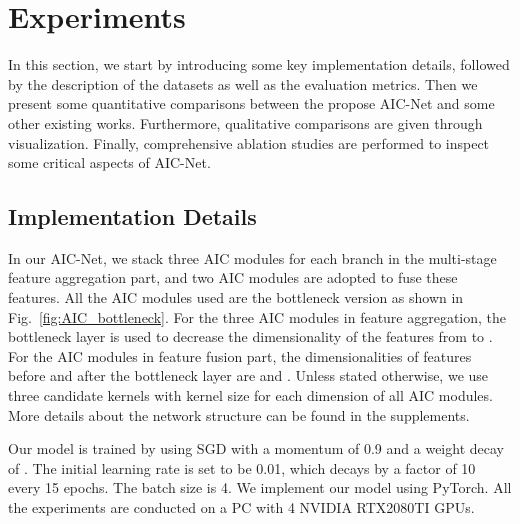 

\section{Experiments}

In this section, we start by introducing some key implementation details, followed by the description of the datasets as well as the evaluation metrics. Then we present some quantitative comparisons between the propose AIC-Net and some other existing works. Furthermore, qualitative comparisons are given through visualization. Finally, comprehensive ablation studies are performed to inspect some critical aspects of AIC-Net.



\subsection{Implementation Details}
\vspace{-0.1cm}
\noindent
In our AIC-Net, we stack three AIC modules for each branch in the multi-stage feature aggregation part, and two AIC modules are adopted to fuse these features. All the AIC modules used are the bottleneck version as shown in Fig.~\ref{fig:AIC_bottleneck}. For the three AIC modules in feature aggregation, the bottleneck layer is used to decrease the dimensionality of the features from  to . For the AIC modules in feature fusion part, the dimensionalities of features before and after the bottleneck layer are  and .  
Unless stated otherwise, we use three candidate kernels with kernel size  for each dimension of all AIC modules. More details about the network structure can be found in the supplements. 

Our model is trained by using SGD with a momentum of 0.9 and a weight decay of . The initial learning rate is set to be 0.01, which decays by a factor of 10 every 15 epochs. The batch size is 4. We implement our model using PyTorch. All the experiments are conducted on a PC with 4 NVIDIA RTX2080TI GPUs. 



